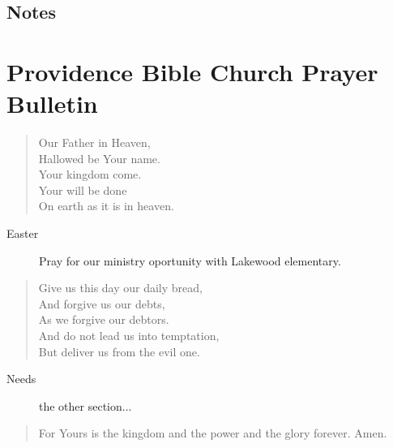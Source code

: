 \documentclass[12pt,twocolumn]{article}
\newcommand{\B}{\begin{description}}
\newcommand{\I}[1]{\item[#1]}
\newcommand{\E}{\end{description}}
\begin{document}
\subsection*{Notes}
\pagebreak
\section*{Providence Bible Church Prayer Bulletin}
\begin{quote}
    Our Father in Heaven, \\
    Hallowed be Your name. \\
    Your kingdom come. \\
    Your will be done \\
    On earth as it is in heaven.
\end{quote}
\B
\I{Easter} Pray for our ministry oportunity with Lakewood elementary.
\E
\begin{quote}
    Give us this day our daily bread, \\
    And forgive us our debts, \\
    As we forgive our debtors. \\
    And do not lead us into temptation, \\
    But deliver us from the evil one.
\end{quote}
\B
\I{Needs} the other section...
\E

\begin{quote}
    For Yours is the kingdom and the power and the glory forever. Amen.
\end{quote}
\end{document}
